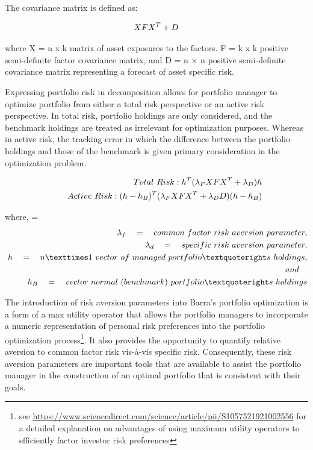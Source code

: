 \documentclass[11pt,preprint, authoryear]{elsarticle}
\numberwithin{equation}{section}
\numberwithin{figure}{section}
\numberwithin{table}{section}
\let\rmarkdownfootnote\footnote%
\def\footnote{\protect\rmarkdownfootnote}
\begin{document}
The covariance matrix is defined as:

\begin{align}
 XFX^T + D \label{eq1} \notag
\end{align}

where X = n x k matrix of asset exposures to the factors. F = k x k
positive semi-definite factor covariance matrix, and D = n × n positive
semi-definite covariance matrix representing a forecast of asset
specific risk.

Expressing portfolio risk in decomposition allows for portfolio manager
to optimize portfolio from either a total risk perspective or an active
risk perspective. In total risk, portfolio holdings are only considered,
and the benchmark holdings are treated as irrelevant for optimization
purposes. Whereas in active risk, the tracking error in which the
difference between the portfolio holdings and those of the benchmark is
given primary consideration in the optimization problem.

\begin{align}
 Total\ Risk : h^T(\lambda_FXFX^T + \lambda_D)h\\ \quad \quad  \notag 
 Active \ Risk : (h-h_B)^T(\lambda_FXFX^T+\lambda_DD)(h-h_B) \notag
\end{align}

where, = \begin{align}
\lambda_f \quad = \quad common \ factor\ risk\ aversion\ parameter,\\ \lambda_d \quad  = \quad specific\ \notag risk\ aversion\ parameter,\\\ h \quad = \quad n×1 \ vector\ of\ managed\ portfolio’s\ holdings,\\ and \quad \notag\\h_B \quad =\quad vector \ normal\ (benchmark)\ portfolio’s\ holdings \notag 
\end{align}

The introduction of risk aversion parameters into Barra's portfolio
optimization is a form of a max utility operator that allows the
portfolio managers to incorporate a numeric representation of personal
risk preferences into the portfolio optimization process\footnote{see
  \url{https://www.sciencedirect.com/science/article/pii/S1057521921002556}
  for a detailed explanation on advantages of using maximum utility
  operators to efficiently factor investor risk preferences}. It also
provides the opportunity to quantify relative aversion to common factor
risk vis-à-vis specific risk. Consequently, these risk aversion
parameters are important tools that are available to assist the
portfolio manager in the construction of an optimal portfolio that is
consistent with their goals.
\end{document}
